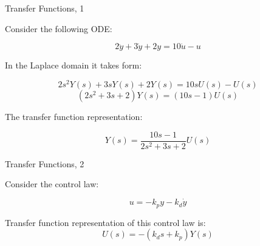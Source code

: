 \documentclass{beamer}
\begin{document}
\begin{frame}{Transfer Functions, 1}
\begin{flushleft}

Consider the following ODE:

\begin{equation}
2 \ddot y + 3 \dot y + 2 y = 10 \dot u - u
\end{equation}

In the Laplace domain it takes form:

\begin{equation}
2 s^2 Y(s) + 3s Y(s) + 2Y(s) = 10s U(s) - U(s)
\end{equation}
%
\begin{equation}
(2s^2 + 3s + 2) Y(s) = (10s - 1)U(s)
\end{equation}

The transfer function representation: 

\begin{equation}
Y(s) = \frac{10s - 1}{2s^2 + 3s + 2} U(s)
\end{equation}

\end{flushleft}
\end{frame}




\begin{frame}{Transfer Functions, 2}
	\begin{flushleft}
		
		Consider the control law:
		
		\begin{equation}
			u = -k_p y - k_d \dot y
		\end{equation}
		
		Transfer function representation of this control law is:
		\begin{equation}
			U(s) = -(k_d s + k_p) Y(s)
		\end{equation}
		
	\end{flushleft}
\end{frame}
\end{document}

